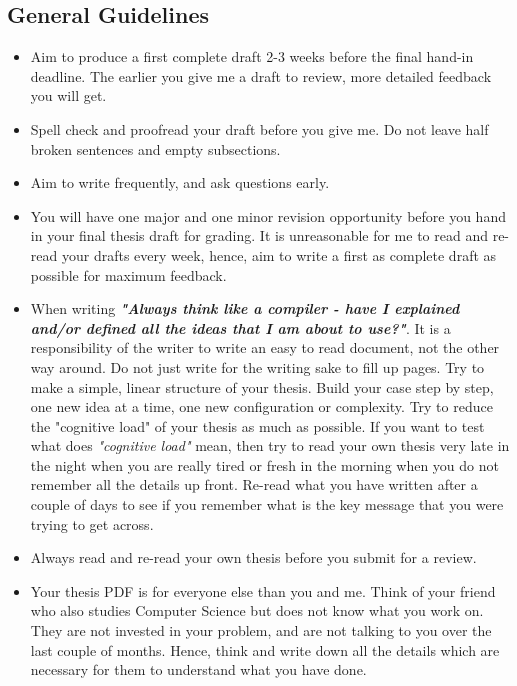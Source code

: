 \documentclass[11pt]{article}
\begin{document}
\subsection*{General Guidelines}
\begin{itemize}
    \item Aim to produce a first complete draft 2-3 weeks before the final hand-in deadline. The earlier you give me a draft to review, more detailed feedback you will get. 
    \item Spell check and proofread your draft before you give me. Do not leave half broken sentences and empty subsections.
    \item Aim to write frequently, and ask questions early. 
    \item You will have one major and one minor revision opportunity before you hand in your final thesis draft for grading. It is unreasonable for me to read and re-read your drafts every week, hence, aim to write a first as complete draft as possible for maximum feedback. 
    \item When writing \textbf{\textit{"Always think like a compiler - have I explained and/or defined all the ideas that I am about to use?"}}. It is a responsibility of the writer to write an easy to read document, not the other way around. Do not just write for the writing sake to fill up pages. Try to make a simple, linear structure of your thesis. Build your case step by step, one new idea at a time, one new configuration or complexity. Try to reduce the "cognitive load" of your thesis as much as possible. If you want to test what does \textit{"cognitive load"} mean, then try to read your own thesis very late in the night when you are really tired or fresh in the morning when you do not remember all the details up front. Re-read what you have written after a couple of days to see if you remember what is the key message that you were trying to get across. 
    \item Always read and re-read your own thesis before you submit for a review. 
    \item Your thesis PDF is for everyone else than you and me. Think of your friend who also studies Computer Science but does not know what you work on. They are not invested in your problem, and are not talking to you over the last couple of months. Hence, think and write down all the details which are necessary for them to understand what you have done. 
\end{itemize}
\end{document}
